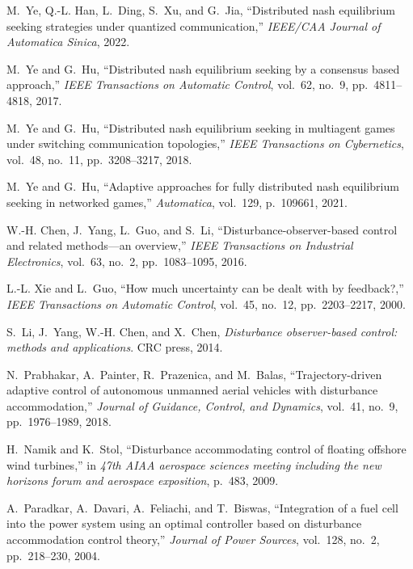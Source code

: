 \documentclass[lettersize,journal]{IEEEtran}
\begin{document}
\begin{thebibliography}{10}
    M.~Ye, Q.-L. Han, L.~Ding, S.~Xu, and G.~Jia, ``Distributed nash equilibrium seeking strategies under quantized communication,'' {\em IEEE/CAA Journal of Automatica Sinica}, 2022.

    M.~Ye and G.~Hu, ``Distributed nash equilibrium seeking by a consensus based approach,'' {\em IEEE Transactions on Automatic Control}, vol.~62, no.~9, pp.~4811--4818, 2017.

    M.~Ye and G.~Hu, ``Distributed nash equilibrium seeking in multiagent games under switching communication topologies,'' {\em IEEE Transactions on Cybernetics}, vol.~48, no.~11, pp.~3208--3217, 2018.

    M.~Ye and G.~Hu, ``Adaptive approaches for fully distributed nash equilibrium seeking in networked games,'' {\em Automatica}, vol.~129, p.~109661, 2021.

    W.-H. Chen, J.~Yang, L.~Guo, and S.~Li, ``Disturbance-observer-based control and related methods—an overview,'' {\em IEEE Transactions on Industrial Electronics}, vol.~63, no.~2, pp.~1083--1095, 2016.

    L.-L. Xie and L.~Guo, ``How much uncertainty can be dealt with by feedback?,'' {\em IEEE Transactions on Automatic Control}, vol.~45, no.~12, pp.~2203--2217, 2000.

    S.~Li, J.~Yang, W.-H. Chen, and X.~Chen, {\em Disturbance observer-based control: methods and applications}.
    \newblock CRC press, 2014.

    N.~Prabhakar, A.~Painter, R.~Prazenica, and M.~Balas, ``Trajectory-driven adaptive control of autonomous unmanned aerial vehicles with disturbance accommodation,'' {\em Journal of Guidance, Control, and Dynamics}, vol.~41, no.~9, pp.~1976--1989, 2018.

    H.~Namik and K.~Stol, ``Disturbance accommodating control of floating offshore wind turbines,'' in {\em 47th AIAA aerospace sciences meeting including the new horizons forum and aerospace exposition}, p.~483, 2009.

    A.~Paradkar, A.~Davari, A.~Feliachi, and T.~Biswas, ``Integration of a fuel cell into the power system using an optimal controller based on disturbance accommodation control theory,'' {\em Journal of Power Sources}, vol.~128, no.~2, pp.~218--230, 2004.


\end{thebibliography}
\end{document}
